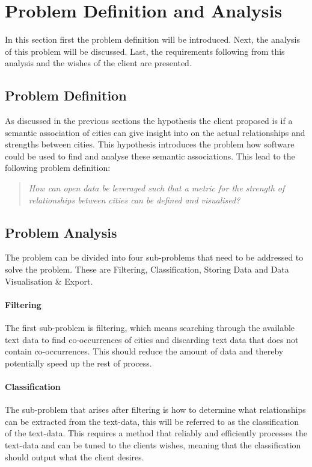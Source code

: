 \chapter{Problem Definition and Analysis}\label{sec:problem-definition-analysis}
In this section first the problem definition will be introduced. Next, the analysis of this problem will be discussed. Last, the requirements following from this analysis and the wishes of the client are presented. 

\section{Problem Definition}\label{sec:3-problem-definition}
As discussed in the previous sections the hypothesis the client proposed is if a semantic association of cities can give insight into on the actual relationships and strengths between cities. This hypothesis introduces the problem how software could be used to find and analyse these semantic associations. This lead to the following problem definition:\\

\begin{quote} 
\centering 
\textit{How can open data be leveraged such that a metric for the strength of relationships between cities can be defined and visualised?}
\end{quote}

\section{Problem Analysis}\label{sec:3-problem-analysis}
The problem can be divided into four sub-problems that need to be addressed to solve the problem. These are Filtering, Classification, Storing Data and  Data Visualisation \& Export. 

\subsubsection{Filtering}
The first sub-problem is filtering, which means searching through the available text data to find co-occurrences of cities and discarding text data that does not contain co-occurrences. This should reduce the amount of data and thereby potentially speed up the rest of process.

\subsubsection{Classification}
The sub-problem that arises after filtering is how to determine what relationships can be extracted from the text-data, this will be referred to as the classification of the text-data. This requires a method that reliably and efficiently processes the text-data and can be tuned to the clients wishes, meaning that the classification should output what the client desires. 

